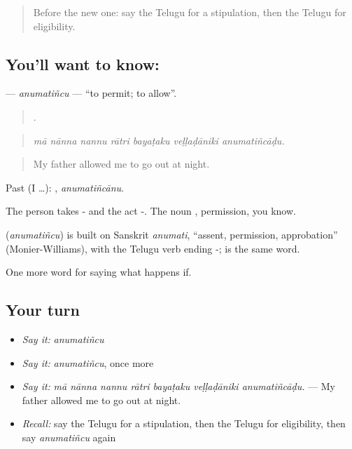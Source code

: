 \label{lesson:TE-C417-anumatincu}



\begin{quote}
Before the new one: say the Telugu for a stipulation, then the Telugu for eligibility.
\end{quote}

\subsection*{You'll want to know: }
\textbf{} — \emph{anumatiñcu} — \textquotedblleft{}to permit; to allow\textquotedblright{}.

\begin{quote}
      .
\end{quote}

\begin{quote}
\emph{mā nānna nannu rātri bayaṭaku veḷḷaḍāniki anumatiñcāḍu.}
\end{quote}

\begin{quote}
My father allowed me to go out at night.
\end{quote}

Past (I …): , \emph{anumatiñcānu}.

The person takes - and the act -. The noun , permission, you know.

\begin{cousinweb}
\textbf{} (\emph{anumatiñcu}) is built on Sanskrit \emph{anumati}, \textquotedblleft{}assent, permission, approbation\textquotedblright{} (Monier-Williams), with the Telugu verb ending -;  is the same word.
\end{cousinweb}

\begin{grammarlens}[title={What you've built}]
One more word for saying what happens if.
\end{grammarlens}

\subsection*{Your turn}
\begin{itemize}
\raggedright
  \item \emph{Say it:} \emph{anumatiñcu}
  \item \emph{Say it:} \emph{anumatiñcu}, once more
  \item \emph{Say it:} \emph{mā nānna nannu rātri bayaṭaku veḷḷaḍāniki anumatiñcāḍu.} — My father allowed me to go out at night.
  \item \emph{Recall:} say the Telugu for a stipulation, then the Telugu for eligibility, then say \emph{anumatiñcu} again
\end{itemize}

